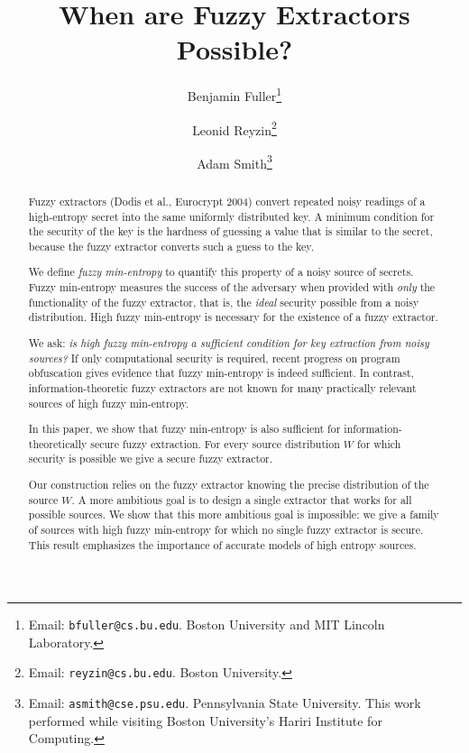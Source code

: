\documentclass[11pt]{article}
\title{When are Fuzzy Extractors Possible?}
\author{
Benjamin Fuller\footnote{Email: {\tt bfuller@cs.bu.edu}.  Boston
  University and MIT Lincoln Laboratory.}  \and Leonid
Reyzin\footnote{Email: {\tt reyzin@cs.bu.edu}.  Boston University.}
\and Adam Smith\footnote{Email: {\tt asmith@cse.psu.edu}.
  Pennsylvania State University. This work performed while visiting Boston
  University's Hariri Institute for Computing.}}
\author{}\institute{}
\begin{document}
\maketitle

\begin{abstract}
Fuzzy extractors (Dodis et al., Eurocrypt 2004) convert repeated noisy
readings of a high-entropy secret into the same uniformly distributed
key. A minimum condition for the security of the key is the hardness
of guessing a value that is similar to the secret, because the fuzzy
extractor converts such a guess to the key.

\smallskip
We define \emph{fuzzy min-entropy} to quantify this property of a noisy source of secrets.  Fuzzy min-entropy measures the success of the adversary when provided with \emph{only} the functionality of the fuzzy extractor, that is, the \emph{ideal} security possible from a noisy distribution.  
High fuzzy min-entropy is necessary for the existence of a fuzzy
extractor. 
\smallskip

We ask: \emph{is high fuzzy min-entropy a
  sufficient condition for key extraction from noisy sources?}
If only computational security is required, recent progress on program
obfuscation gives evidence that fuzzy
min-entropy is indeed sufficient. In contrast,
information-theoretic fuzzy extractors are not known for many
practically relevant sources of high fuzzy min-entropy. 
\smallskip

In this paper, we show that fuzzy min-entropy is also sufficient for
information-theoretically secure fuzzy extraction. For every source
distribution $W$ for which security is possible we give a secure fuzzy
extractor. 

\smallskip
Our construction relies on the fuzzy extractor knowing the precise
distribution of the source $W$.  A more ambitious goal is to design a
single extractor that works for all possible sources.  We show that
this more ambitious goal is impossible: we give a family of sources
with high fuzzy min-entropy for which no single fuzzy extractor is
secure.  This result emphasizes the importance of accurate models
of high entropy sources.



\end{abstract}
\end{document}
